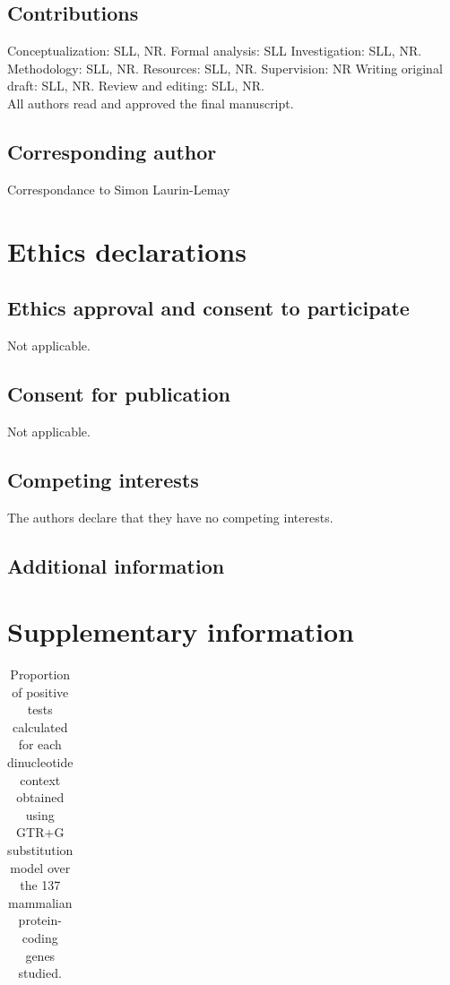 \documentclass{article}
\newcommand{\beginsupplement}{
        \setcounter{table}{0}
        \renewcommand{\thetable}{S\arabic{table}}%
        \setcounter{figure}{0}
        \renewcommand{\thefigure}{S\arabic{figure}}%
}
\begin{document}
\subsection*{Contributions}
Conceptualization: SLL, NR. Formal analysis: SLL Investigation: SLL, NR. Methodology: SLL, NR. Resources: SLL, NR. Supervision: NR Writing original draft: SLL, NR. Review and editing: SLL, NR. \\
All authors read and approved the final manuscript.
\subsection*{Corresponding author}
Correspondance to Simon Laurin-Lemay
\section*{Ethics declarations}
\subsection*{Ethics approval and consent to participate}
Not applicable.
\subsection*{Consent for publication}
Not applicable.
\subsection*{Competing interests}
The authors declare that they have no competing interests.
\subsection*{Additional information}
\section*{Supplementary information}
\beginsupplement
\begin{table}[h]
\begin{tabular}{}
\end{tabular} 
\caption{Proportion of positive tests calculated for each dinucleotide context obtained using GTR+G substitution model over the 137 mammalian protein-coding genes studied.}
\label{table_S1}
\end{table}
\end{document}
